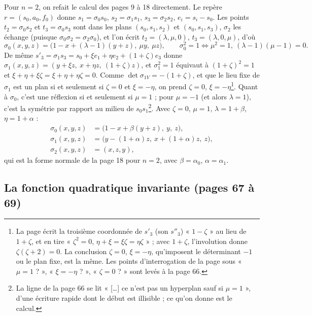 \documentclass[11pt,a4paper]{article}
\begin{document}
Pour $n = 2$, on refait le calcul des pages 9 à 18 directement. Le repère $r =
(s_0, a_0, f_0)$ donne $s_1 = \sigma_0 s_0$, $s_2 = \sigma_1 s_1$, $s_3 = \sigma_2
s_2$, $e_i = s_i - s_0$. Les points $t_2 = \sigma_0 s_2$ et $t_3 = \sigma_0 s_3$
sont dans les plans $(s_0, s_1, s_2)$ et $(s_0, s_1, s_3)$, $\sigma_2$ les échange
(puisque $\sigma_0\sigma_2 = \sigma_2\sigma_0$), et l'on écrit $t_2 = (\lambda,
\mu, 0)$, $t_3 = (\lambda, 0, \mu)$, d'où
\[
\sigma_0(x, y, z) = \bigl(1 - x + (\lambda - 1)(y + z),\ \mu y,\ \mu z\bigr), \qquad
\sigma_0^2 = 1 \iff \mu^2 = 1,\ (\lambda - 1)(\mu - 1) = 0 .
\]
De même $s'_3 = \sigma_1 s_3 = s_0 + \xi e_1 + \eta e_2 + (1 + \zeta)e_3$ donne
$\sigma_1(x, y, z) = (y + \xi z,\ x + \eta z,\ (1 + \zeta)z)$, et $\sigma_1^2 = 1$
équivaut à $(1 + \zeta)^2 = 1$ et $\xi + \eta + \xi\zeta = \xi + \eta + \eta\zeta = 0$.
Comme $\det\sigma_{1V} = -(1 + \zeta)$, et que le lieu fixe de $\sigma_1$ est un
plan si et seulement si $\zeta = 0$ et $\xi = -\eta$, on prend $\zeta = 0$,
$\xi = -\eta$\footnote{La page écrit la troisième coordonnée de $s'_3$ (son
$s''_3$) « $1 - \zeta$ » au lieu de $1 + \zeta$, et en tire « $\zeta^2 = 0$,
$\eta + \xi = \xi\zeta = \eta\zeta$ » ; avec $1 + \zeta$, l'involution donne
$\zeta(\zeta + 2) = 0$. La conclusion $\zeta = 0$, $\xi = -\eta$, qu'imposent le
déterminant $-1$ ou le plan fixe, est la même. Les points d'interrogation de la
page sous « $\mu = 1$ ? », « $\xi = -\eta$ ? », « $\zeta = 0$ ? » sont levés à la
page 66.}. Quant à $\sigma_0$, c'est une réflexion si et seulement si $\mu =
1$ ; pour $\mu = -1$ (et alors $\lambda = 1$), c'est la symétrie par rapport au
milieu de $s_0 s_1$\footnote{La ligne de la page 66 se lit « [\ldots] ce n'est pas un hyperplan sauf si $\mu = 1$ », d'une écriture rapide dont le début est illisible ; ce qu'on donne est le calcul.}. Avec $\zeta =
0$, $\mu = 1$, $\lambda = 1 + \beta$, $\eta = 1 + \alpha$ :
\[
\begin{aligned}
\sigma_0(x, y, z) &= \bigl(1 - x + \beta(y + z),\ y,\ z\bigr), \\
\sigma_1(x, y, z) &= \bigl(y - (1 + \alpha)z,\ x + (1 + \alpha)z,\ z\bigr), \\
\sigma_2(x, y, z) &= (x, z, y),
\end{aligned}
\]
qui est la forme normale de la page 18 pour $n = 2$, avec $\beta = \alpha_0$,
$\alpha = \alpha_1$.

\subsection*{La fonction quadratique invariante (pages 67 à 69)}
\end{document}
